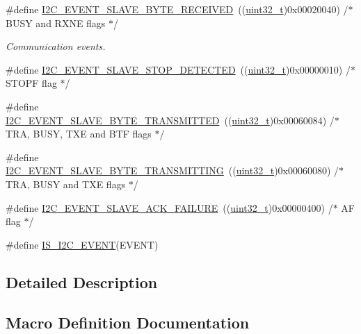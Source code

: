 \begin{DoxyCompactItemize}
\item 
\#define \hyperlink{group___i2_c___events_ga8b244626839940569c6c8bbfc4efe21d}{I2\+C\+\_\+\+E\+V\+E\+N\+T\+\_\+\+S\+L\+A\+V\+E\+\_\+\+B\+Y\+T\+E\+\_\+\+R\+E\+C\+E\+I\+V\+ED}~((\hyperlink{_p_e___types_8h_a33594304e786b158f3fb30289278f5af}{uint32\+\_\+t})0x00020040)  /$\ast$ B\+U\+S\+Y and R\+X\+N\+E flags $\ast$/
\begin{DoxyCompactList}\small\item\em Communication events. \end{DoxyCompactList}\item 
\#define \hyperlink{group___i2_c___events_ga3148d8d7087e418959bc31e2646b2941}{I2\+C\+\_\+\+E\+V\+E\+N\+T\+\_\+\+S\+L\+A\+V\+E\+\_\+\+S\+T\+O\+P\+\_\+\+D\+E\+T\+E\+C\+T\+ED}~((\hyperlink{_p_e___types_8h_a33594304e786b158f3fb30289278f5af}{uint32\+\_\+t})0x00000010)  /$\ast$ S\+T\+O\+P\+F flag $\ast$/
\item 
\#define \hyperlink{group___i2_c___events_ga50652880323b8c2746b5afbdfea03fe1}{I2\+C\+\_\+\+E\+V\+E\+N\+T\+\_\+\+S\+L\+A\+V\+E\+\_\+\+B\+Y\+T\+E\+\_\+\+T\+R\+A\+N\+S\+M\+I\+T\+T\+ED}~((\hyperlink{_p_e___types_8h_a33594304e786b158f3fb30289278f5af}{uint32\+\_\+t})0x00060084)  /$\ast$ T\+R\+A, B\+U\+S\+Y, T\+X\+E and B\+T\+F flags $\ast$/
\item 
\#define \hyperlink{group___i2_c___events_gaa574c93a99497649f3d8e7ff53796231}{I2\+C\+\_\+\+E\+V\+E\+N\+T\+\_\+\+S\+L\+A\+V\+E\+\_\+\+B\+Y\+T\+E\+\_\+\+T\+R\+A\+N\+S\+M\+I\+T\+T\+I\+NG}~((\hyperlink{_p_e___types_8h_a33594304e786b158f3fb30289278f5af}{uint32\+\_\+t})0x00060080)  /$\ast$ T\+R\+A, B\+U\+S\+Y and T\+X\+E flags $\ast$/
\item 
\#define \hyperlink{group___i2_c___events_ga249bd611f1ca64653c0bfc606c591088}{I2\+C\+\_\+\+E\+V\+E\+N\+T\+\_\+\+S\+L\+A\+V\+E\+\_\+\+A\+C\+K\+\_\+\+F\+A\+I\+L\+U\+RE}~((\hyperlink{_p_e___types_8h_a33594304e786b158f3fb30289278f5af}{uint32\+\_\+t})0x00000400)  /$\ast$ A\+F flag $\ast$/
\item 
\#define \hyperlink{group___i2_c___events_ga4b42e6936006195f89ff4f763d366970}{I\+S\+\_\+\+I2\+C\+\_\+\+E\+V\+E\+NT}(E\+V\+E\+NT)
\end{DoxyCompactItemize}


\subsection{Detailed Description}


\subsection{Macro Definition Documentation}

